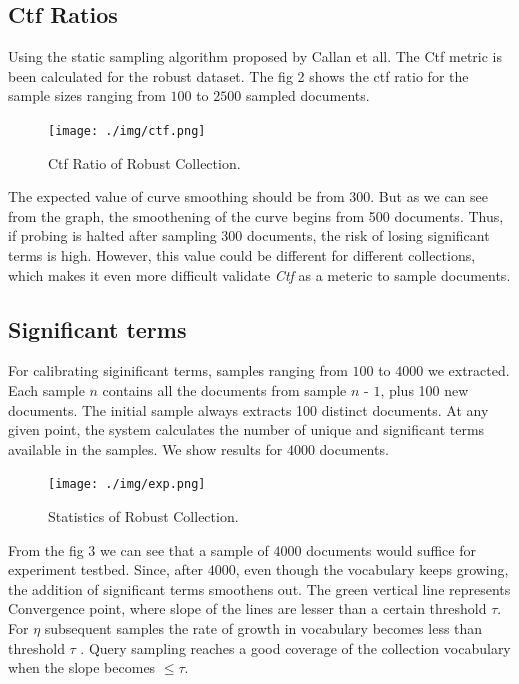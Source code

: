 \documentclass[paper=a4, fontsize=11pt,twoside]{scrartcl}	%
\begin{document}

\subsection{Ctf Ratios}
Using the static sampling algorithm proposed by Callan et all. The Ctf metric is been calculated for the robust dataset. The fig 2 shows the ctf ratio for the sample sizes ranging from $100$ to $2500$ sampled documents. 

\begin{figure}[H]
\centering
\texttt{[image: ./img/ctf.png]}
\caption{\label{fig:2}Ctf Ratio of Robust Collection.}
\end{figure}

The expected value of curve smoothing should be from 300. But as we can see from the graph, the smoothening of the curve begins from 500 documents. Thus, if probing is halted after sampling 300 documents,
the risk of losing significant terms is high. However, this value could be different for different collections, which makes it even more difficult validate \textit{Ctf} as a meteric to sample documents.

\subsection{Significant terms}

For calibrating siginificant terms, samples ranging from $100$ to $4000$ we extracted. Each sample $n$ contains all the documents from sample $n$ - $1$, plus 100 new documents. The initial sample always extracts 100 distinct documents. At any given point, the system calculates the number of unique and significant terms
available in the samples. We show results for $4000$ documents.

\begin{figure}[H]
\centering
\texttt{[image: ./img/exp.png]}
\caption{\label{fig:3}Statistics of Robust Collection.}
\end{figure}

From the fig 3 we can see that a sample of $4000$ documents would suffice for experiment testbed. Since, after $4000$, even though the vocabulary keeps growing, the addition of significant terms smoothens out. The green vertical line represents Convergence point, where slope of the lines are lesser than a certain threshold $\tau$.
For $\eta$  subsequent samples the rate of growth in vocabulary becomes less than threshold $\tau$ . Query sampling reaches a good coverage of the collection vocabulary when the slope becomes $\leq \tau$.
\end{document}
